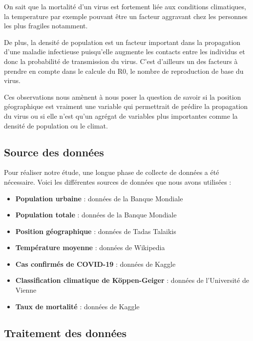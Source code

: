 \documentclass[12pt]{iEEEtran}
\begin{document}
On sait que la mortalité d'un virus est fortement liée aux conditions climatiques,
la temperature par exemple pouvant être un facteur aggravant chez les personnes
les plus fragiles notamment. \cite{climate_mortality}

De plus, la densité de population est un facteur important dans la propagation d'une maladie
infectieuse puisqu'elle augmente les contacts entre les individus et donc la probabilité
de transmission du virus. C'est d'ailleurs un des facteurs à prendre en compte dans le calcule
du R0, le nombre de reproduction de base du virus. \cite{R0_wiki} \cite{sy2021population}

Ces observations nous amènent à nous poser la question de savoir si la position géographique
est vraiment une variable qui permettrait de prédire la propagation du virus ou si elle n'est qu'un
agrégat de variables plus importantes comme la densité de population ou le climat.

\subsection{Source des données}
Pour réaliser notre étude, une longue phase de collecte de données a été nécessaire. Voici les
différentes sources de données que nous avons utilisées :
\begin{itemize}
    \item \textbf{Population urbaine} : données de la Banque Mondiale \cite{urban_pop}
    \item \textbf{Population totale} : données de la Banque Mondiale \cite{total_pop}
    \item \textbf{Position géographique} : données de Tadas Talaikis \cite{country_pos}
    \item \textbf{Température moyenne} : données de Wikipedia \cite{mean_temp}
    \item \textbf{Cas confirmés de COVID-19} : données de Kaggle \cite{covid_confirmed}
    \item \textbf{Classification climatique de Köppen-Geiger} : données de l'Université de Vienne \cite{climate_classification}
    \item \textbf{Taux de mortalité} : données de Kaggle \cite{mortality_rate}
\end{itemize}

\subsection{Traitement des données}
\end{document}
